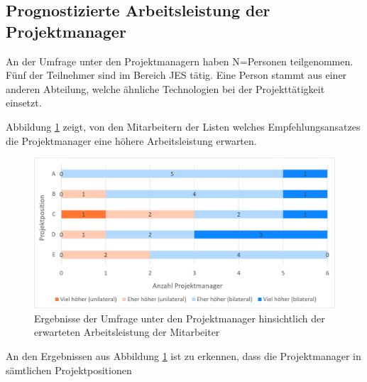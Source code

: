 \subsection{Prognostizierte Arbeitsleistung der Projektmanager}
\label{ch:ergebnisse:fallstudie:arbeitsleistung}
An der Umfrage unter den Projektmanagern haben N=\anzPM Personen teilgenommen. Fünf der Teilnehmer sind im Bereich \acl{JES} tätig. Eine Person stammt aus einer anderen Abteilung, welche ähnliche Technologien bei der Projekttätigkeit einsetzt.

Abbildung \ref{fig:ergebnisse:fallstudie:arbeitsleistung:abb1} zeigt, von den Mitarbeitern der Listen welches Empfehlungsansatzes die Projektmanager eine höhere Arbeitsleistung erwarten.

\begin{figure}[h]
	\centering
	\includegraphics[width=1\textwidth]{gfx/ergebnisse-projektmanager-arbeitsleistung.png}	
	\caption{Ergebnisse der Umfrage unter den Projektmanager hinsichtlich der erwarteten Arbeitsleistung der Mitarbeiter}
	\label{fig:ergebnisse:fallstudie:arbeitsleistung:abb1}
\end{figure}

An den Ergebnissen aus Abbildung \ref{fig:ergebnisse:fallstudie:arbeitsleistung:abb1} ist zu erkennen, dass die Projektmanager in sämtlichen Projektpositionen 

